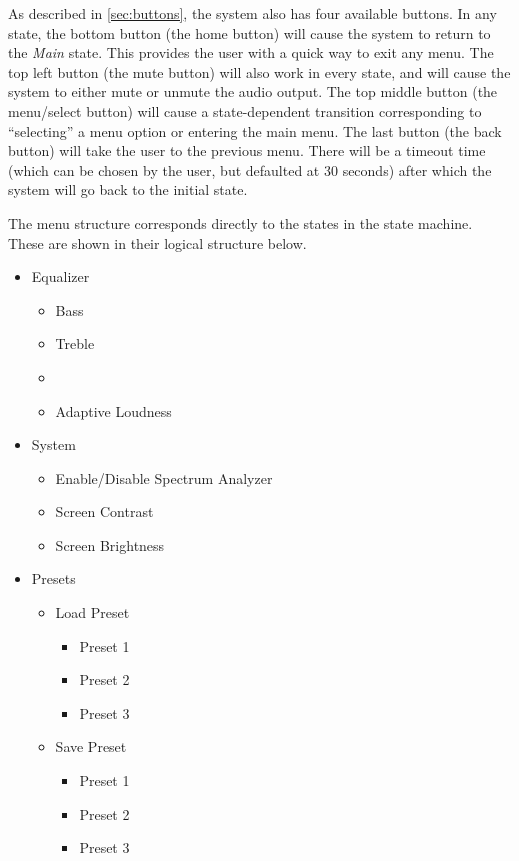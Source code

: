 As described in \ref{sec:buttons}, the system also has four available buttons. In any state, the bottom button (the home button) will cause the system to return to the \emph{Main} state. This provides the user with a quick way to exit any menu. The top left button (the mute button) will also work in every state, and will cause the system to either mute or unmute the audio output. The top middle button (the menu/select button) will cause a state-dependent transition corresponding to ``selecting'' a menu option or entering the main menu. The last button (the back button) will take the user to the previous menu. There will be a timeout time (which can be chosen by the user, but defaulted at 30 seconds) after which the system will go back to the initial state.

The menu structure corresponds directly to the states in the state machine. These are shown in their logical structure below.

\begin{itemize}

\item Equalizer
\begin{itemize}
	\item Bass
	\item Treble
	\item 
	\item Adaptive Loudness
\end{itemize}

\item System
\begin{itemize}
	\item Enable/Disable Spectrum Analyzer
	\item Screen Contrast
	\item Screen Brightness
\end{itemize}

\item Presets
\begin{itemize}
	\item Load Preset
	\begin{itemize}
		\item Preset 1
		\item Preset 2
		\item Preset 3
	\end{itemize}

	\item Save Preset
	\begin{itemize}
		\item Preset 1
		\item Preset 2
		\item Preset 3
	\end{itemize}

\end{itemize}

\end{itemize}
